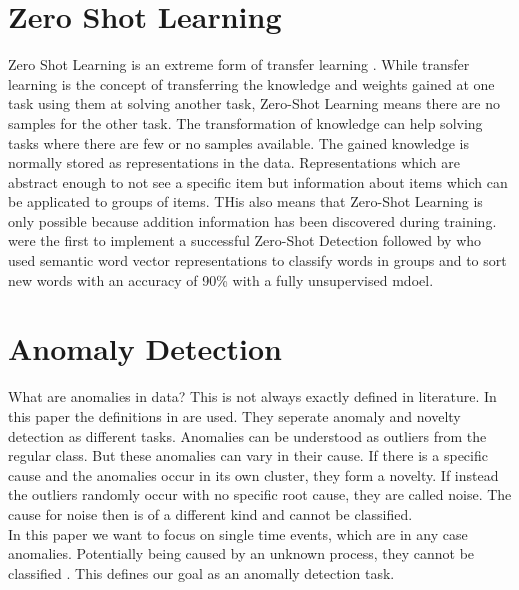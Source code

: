 \section{Zero Shot Learning}
Zero Shot Learning is an extreme form of transfer learning \cite[S. 536]{goodfellow_deep_2016}. While transfer learning is the concept of transferring the knowledge and weights gained at one task using them at solving another task, Zero-Shot Learning means there are no samples for the other task. The transformation of knowledge can help solving tasks where there are few or no samples available. The gained knowledge is normally stored as representations in the data. Representations which are abstract enough to not see a specific item but information about items which can be applicated to groups of items. THis also means that Zero-Shot Learning is only possible because addition information has been discovered during training.\\
 were the first to implement a successful Zero-Shot Detection followed by  who used semantic word vector representations to classify words in groups and to sort new words with an accuracy of 90\% with a fully unsupervised mdoel.
\section{Anomaly Detection}
What are anomalies in data? This is not always exactly defined in literature. In this paper the definitions in  are used. They seperate anomaly and novelty detection as different tasks. Anomalies can be understood as outliers from the regular class. But these anomalies can vary in their cause. If there is a specific cause and the anomalies occur in its own cluster, they form a novelty. If instead the outliers randomly occur with no specific root cause, they are called noise. The cause for noise then is of a different kind and cannot be classified.\\
In this paper we want to focus on single time events, which are in any case anomalies. Potentially being caused by an unknown process, they cannot be classified \cite{gruhl_novelty_2022}. This defines our goal as an anomally detection task.
